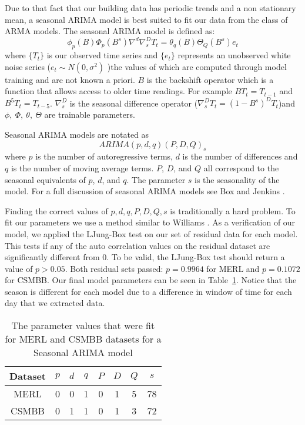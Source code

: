 Due to that fact that our building data has periodic trends and a non stationary mean, a seasonal ARIMA model is best suited to fit our data from the class of ARMA models.  The seasonal ARIMA model is defined as:
\begin{equation}
\label{eq:sarima}
\phi_{p}(B)\Phi_{p}(B^{s})\nabla^{d}\nabla^{D}_{s}T_{t} = \theta_{q}(B)\Theta_{Q}(B^{s})e_{t}
\end{equation}
\noindent
where $\{T_{t}\}$ is our observed time series and $\{e_t\}$ represents an unobserved white noise series ($e_{t} \sim N(0, \sigma^{2})$ )the values of which are computed through model training and are not known a priori.  $B$ is the backshift operator which is a function that allows access to older time readings.  For example $BT_{t} = T_{t-1}$ and $B^{5}T_{t} = T_{t-5}$.  $\nabla^{D}_{s}$ is the seasonal difference operator ($\nabla^{D}_{s}T_{t} = (1 - B^{s})^{D}T_{t}$)and $\phi,\  \Phi,\  \theta,\ \Theta$ are trainable parameters.  

Seasonal ARIMA models are notated as
\begin{equation}
ARIMA(p,d,q)(P,D,Q)_{s}
\end{equation}
where $p$ is the number of autoregressive terms, $d$ is the number of differences and $q$ is the number of moving average terms.  $P$, $D$, and $Q$ all correspond to the seasonal equivalents of $p$, $d$, and $q$.  The parameter $s$ is the seasonality of the model.  For a full discussion of seasonal ARIMA models see Box and Jenkins \cite{Box2008}.

Finding the correct values of $p, d, q, P, D, Q, s$ is traditionally a hard problem.  To fit our parameters we use a method similar to Williams \cite{Williams2003}.  As a verification of our model, we applied the LJung-Box test \cite{Ljung1978} on our set of residual data for each model.  This tests if any of the auto correlation values on the residual dataset are significantly different from 0.  To be valid, the LJung-Box test should return a value of $p > 0.05$.  Both residual sets passed: $p = 0.9964$ for MERL and $p = 0.1072$ for CSMBB.  Our final model parameters can be seen in Table~\ref{fig:sarimatab}.  Notice that the season is different for each model due to a difference in window of time for each day that we extracted data.

\begin{table}[t]
\centering
\caption{The parameter values that were fit for MERL and CSMBB datasets for a Seasonal ARIMA model}
\begin{tabular}{|c|c|c|c|c|c|c|c|} \hline
Dataset & $p$ & $d$ & $q$ & $P$ & $D$ & $Q$ & $s$\\ \hline
MERL & 0 & 0 & 1 & 0 & 1 & 5 & 78\\ \hline
CSMBB & 0 & 1 & 1 & 0 & 1 & 3 & 72\\ \hline
\end{tabular}
\label{fig:sarimatab}
\end{table}

